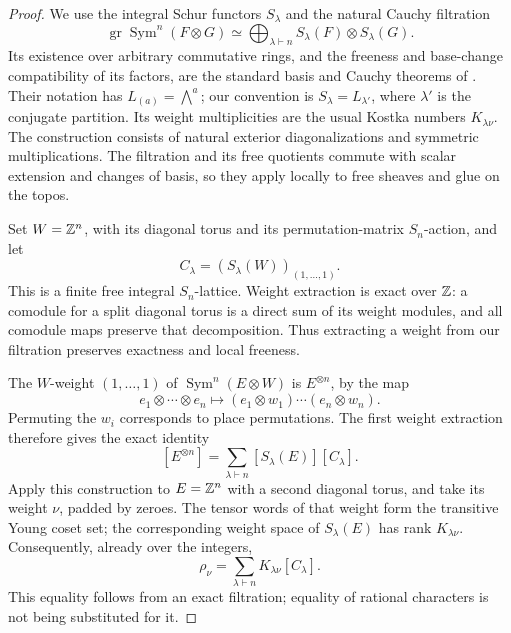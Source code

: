 \begin{proof}
We use the integral Schur functors $S_\lambda$ and the natural
Cauchy filtration
\[
 \operatorname{gr}\operatorname{Sym}^n(F\otimes G)
 \simeq\bigoplus_{\lambda\vdash n}S_\lambda(F)\otimes S_\lambda(G).
\]
Its existence over arbitrary commutative rings, and the freeness
and base-change compatibility of its factors, are the standard
basis and Cauchy theorems of
\citet[Theorem~II.2.16, p.~232; Theorem~III.1.4,
pp.~245--246]{ABW1982}.  Their notation has $L_{(a)}=\bigwedge^a$;
our convention is $S_\lambda=L_{\lambda'}$, where $\lambda'$
is the conjugate partition.  Its weight multiplicities are the
usual Kostka numbers $K_{\lambda\nu}$.
The construction consists of natural exterior diagonalizations
and symmetric multiplications.  The filtration and its free
quotients commute with scalar extension and changes of basis,
so they apply locally to free sheaves and glue on the topos.

Set $W=\mathbb Z^n$, with its diagonal torus and its permutation-matrix
$S_n$-action, and let
\[
 C_\lambda=(S_\lambda(W))_{(1,\ldots,1)}.
\]
This is a finite free integral $S_n$-lattice.  Weight extraction
is exact over $\mathbb Z$: a comodule for a split diagonal torus is a
direct sum of its weight modules, and all comodule maps preserve
that decomposition.  Thus extracting a weight from our filtration
preserves exactness and local freeness.

The $W$-weight $(1,\ldots,1)$ of
$\operatorname{Sym}^n(E\otimes W)$ is $E^{\otimes n}$, by the map
\[
 e_1\otimes\cdots\otimes e_n\longmapsto
 (e_1\otimes w_1)\cdots(e_n\otimes w_n).
\]
Permuting the $w_i$ corresponds to place permutations.  The first
weight extraction therefore gives the exact identity
\begin{equation}\label{eq:schur-tensor}
 [E^{\otimes n}]=\sum_{\lambda\vdash n}[S_\lambda(E)][C_\lambda].
\end{equation}
Apply this construction to $E=\mathbb Z^n$ with a second diagonal torus,
and take its weight $\nu$, padded by zeroes.  The tensor words of
that weight form the transitive Young coset set; the corresponding
weight space of $S_\lambda(E)$ has rank $K_{\lambda\nu}$.
Consequently, already over the integers,
\begin{equation}\label{eq:integral-Young}
 \rho_\nu=\sum_{\lambda\vdash n}K_{\lambda\nu}[C_\lambda].
\end{equation}
This equality follows from an exact filtration; equality of
rational characters is not being substituted for it.


\end{proof}
